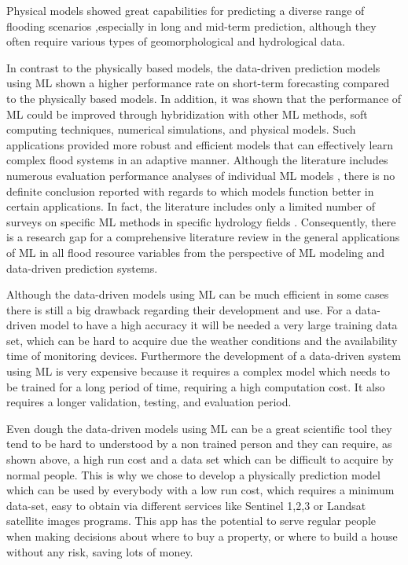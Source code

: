 \documentclass[12pt, a4paper]{report}
\begin{document}
Physical models showed great capabilities for predicting a diverse range of flooding scenarios \cite{Nayak},especially in long and mid-term prediction, although they often require various types of geomorphological and  hydrological data. 
\par 

In contrast to the physically based models, the data-driven prediction models using ML shown a higher performance rate on  short-term forecasting compared to the physically based models. In addition, it was shown that the performance of ML could be improved through hybridization  with other ML methods, soft computing techniques, numerical simulations, and physical models. Such applications provided more robust and efficient models that can effectively learn complex flood systems in an adaptive manner. Although the literature includes numerous evaluation performance analyses of individual ML models \cite{Taherei, Kasiviswanathan, Ravansalar, Mosavi}, there is no definite conclusion reported with regards to which models function better in certain applications. In fact, the literature includes only a limited number of surveys on specific ML methods in specific hydrology fields \cite{Dandagala, Deka, Fotovatikhah}. Consequently, there is a research gap for a comprehensive literature review in the general applications of ML in all flood resource variables from the perspective of ML modeling and data-driven prediction systems.
\par 

Although the data-driven models using ML can be much efficient in some cases there is still a big drawback regarding their development and use. For a data-driven model to have a high accuracy it will be needed a very large training data set, which can be hard to acquire due the weather conditions and the availability time of monitoring devices. Furthermore the development of a data-driven system using ML is very expensive because it requires a complex model which needs to be trained for a long period of time, requiring a high computation cost. It also requires a longer validation, testing, and evaluation period.
\par

Even dough the data-driven models using ML can be a great scientific tool they tend to be hard to understood by a non trained person and they can require, as shown above, a high run cost and a data set which can be difficult to acquire by normal people. This is why we chose to develop a physically prediction model which can be used by everybody with a low run cost, which requires a minimum data-set, easy to obtain via different services like Sentinel 1,2,3 or Landsat satellite images programs. This app has the potential to serve regular people when making decisions about where to buy a property, or where to build a house without any risk, saving lots of money.
\par
\end{document}
